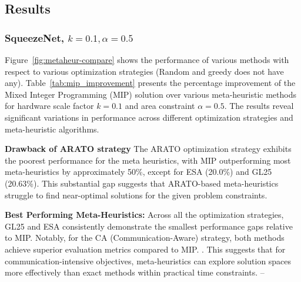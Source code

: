 \subsection{Results}

\subsubsection{SqueezeNet, $k=0.1, \alpha=0.5$}

Figure~\ref{fig:metaheur-compare} shows the performance of various methods with respect to various optimization strategies (Random and greedy does not have any).
Table~\ref{tab:mip_improvement} presents the percentage improvement of the Mixed Integer Programming (MIP) solution over various meta-heuristic methods for hardware scale factor $k = 0.1$ and area constraint $\alpha = 0.5$. The results reveal significant variations in performance across different optimization strategies and meta-heuristic algorithms.

\noindent
\textbf{Drawback of ARATO strategy}
The ARATO optimization strategy exhibits the poorest performance for the meta heuristics, with MIP outperforming most meta-heuristics by approximately 50\%, except for ESA (20.0\%) and GL25 (20.63\%). This substantial gap suggests that ARATO-based meta-heuristics struggle to find near-optimal solutions for the given problem constraints.

\noindent
\textbf{Best Performing Meta-Heuristics:}
Across all the optimization strategies, GL25 and ESA consistently demonstrate the smallest performance gaps relative to MIP. Notably, for the CA (Communication-Aware) strategy, both methods achieve superior evaluation metrics compared to MIP. . This suggests that for communication-intensive objectives, meta-heuristics can explore solution spaces more effectively than exact methods within practical time constraints. --

